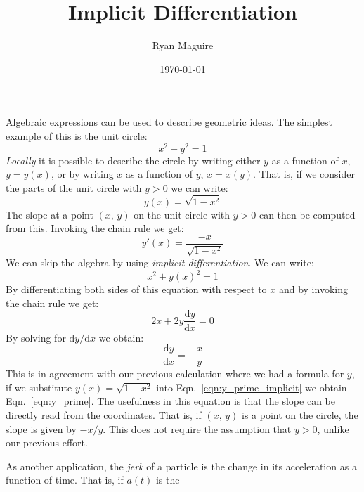 \documentclass{article}
\title{Implicit Differentiation}
\author{Ryan Maguire}
\date{\today}
\theoremstyle{plain}
\begin{document}
    \maketitle
    Algebraic expressions can be used to describe geometric ideas. The
    simplest example of this is the unit circle:
    \begin{equation}
        x^{2}+y^{2}=1
    \end{equation}
    \textit{Locally} it is possible to describe the circle by writing either
    $y$ as a function of $x$, $y=y(x)$, or by writing $x$ as a function of
    $y$, $x=x(y)$. That is, if we consider the parts of the unit circle with
    $y>0$ we can write:
    \begin{equation}
        y(x)=\sqrt{1-x^{2}}
    \end{equation}
    The slope at a point $(x,\,y)$ on the unit circle with $y>0$ can then be
    computed from this. Invoking the chain rule we get:
    \begin{equation}
        \label{eqn:y_prime}
        y'(x)=\frac{-x}{\sqrt{1-x^{2}}}
    \end{equation}
    We can skip the algebra by using \textit{implicit differentiation}. We can
    write:
    \begin{equation}
        x^{2}+y(x)^{2}=1
    \end{equation}
    By differentiating both sides of this equation with respect to $x$ and by
    invoking the chain rule we get:
    \begin{equation}
        2x+2y\frac{\textrm{d}y}{\textrm{d}x}=0
    \end{equation}
    By solving for $\textrm{d}y/\textrm{d}x$ we obtain:
    \begin{equation}
        \label{eqn:y_prime_implicit}
        \frac{\textrm{d}y}{\textrm{d}x}=-\frac{x}{y}
    \end{equation}
    This is in agreement with our previous calculation where we had a formula
    for $y$, if we substitute $y(x)=\sqrt{1-x^{2}}$ into
    Eqn.~\ref{eqn:y_prime_implicit} we obtain
    Eqn.~\ref{eqn:y_prime}. The usefulness in this equation is that the slope
    can be directly read from the coordinates. That is, if $(x,\,y)$ is a point
    on the circle, the slope is given by $-x/y$. This does not require the
    assumption that $y>0$, unlike our previous effort.
    \par\hfill\par
    As another application, the \textit{jerk} of a particle is the change in
    its acceleration as a function of time. That is, if $a(t)$ is the
\end{document}
